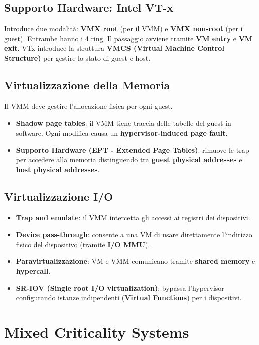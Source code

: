 \documentclass[11pt,a4paper]{report}
\begin{document}
\section{Supporto Hardware: Intel VT-x}

Introduce due modalità: \textbf{VMX root} (per il VMM) e \textbf{VMX non-root} (per i guest). Entrambe hanno i 4 ring. Il passaggio avviene tramite \textbf{VM entry} e \textbf{VM exit}. VTx introduce la struttura \textbf{VMCS (Virtual Machine Control Structure)} per gestire lo stato di guest e host.

\section{Virtualizzazione della Memoria}

Il VMM deve gestire l'allocazione fisica per ogni guest.
\begin{itemize}
    \item \textbf{Shadow page tables}: il VMM tiene traccia delle tabelle del guest in software. Ogni modifica causa un \textbf{hypervisor-induced page fault}.
    \item \textbf{Supporto Hardware (EPT - Extended Page Tables)}: rimuove le trap per accedere alla memoria distinguendo tra \textbf{guest physical addresses} e \textbf{host physical addresses}.
\end{itemize}

\section{Virtualizzazione I/O}

\begin{itemize}
    \item \textbf{Trap and emulate}: il VMM intercetta gli accessi ai registri dei dispositivi.
    \item \textbf{Device pass-through}: consente a una VM di usare direttamente l'indirizzo fisico del dispositivo (tramite \textbf{I/O MMU}).
    \item \textbf{Paravirtualizzazione}: VM e VMM comunicano tramite \textbf{shared memory} e \textbf{hypercall}.
    \item \textbf{SR-IOV (Single root I/O virtualization)}: bypassa l'hypervisor configurando istanze indipendenti (\textbf{Virtual Functions}) per i dispositivi.
\end{itemize}


\chapter{Mixed Criticality Systems}
\end{document}
